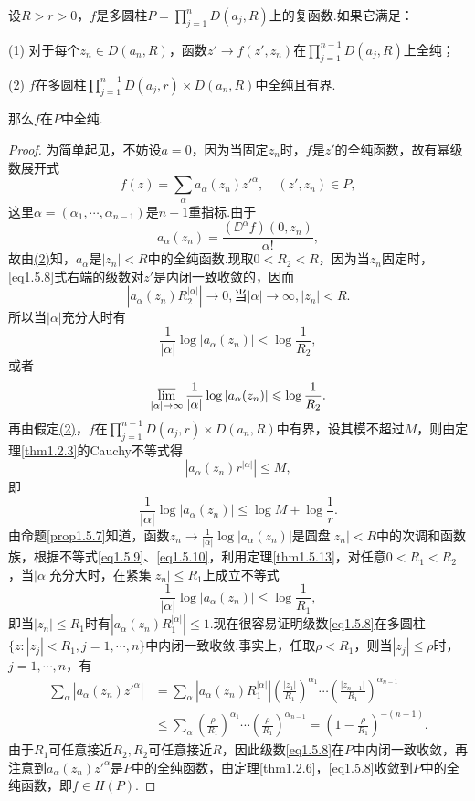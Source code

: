 \begin{lemma}\label{lem1.5.18}
	设$R>r>0$，$f$是多圆柱$P=\prod\limits_{j=1}^{n}D(a_j,R)$上的复函数.如果它满足：
	
	(1)\hypertarget{1.5.18}{}
	对于每个$z_n\in D(a_n,R)$，函数$z'\to f(z',z_n)$在$\prod\limits_{j=1}^{n-1} D(a_j,R)$上全纯；
	
	(2)\hypertarget{1.5.18}{}
	$f$在多圆柱$\prod\limits_{j=1}^{n-1}D(a_j,r)\times D(a_n,R)$中全纯且有界.
	
	那么$f$在$P$中全纯.
\end{lemma}
\begin{proof}
	为简单起见，不妨设$a=0$，因为当固定$z_n$时，$f$是$z'$的全纯函数，故有幂级数展开式
	\begin{equation}\label{eq1.5.8}
		f(z)=\sum_\alpha a_\alpha(z_n)z'^{\alpha},\quad (z',z_n)\in P,
	\end{equation}
这里$\alpha=(\alpha_1,\cdots,\alpha_{n-1})$是$n-1$重指标.由于
\[a_\alpha(z_n)=\frac{(\DD^\alpha f)(0,z_n)}{\alpha!},\]
故由\hyperlink{1.5.18}{(2)}知，$a_\alpha$是$|z_n|<R$中的全纯函数.现取$0<R_2<R$，因为当$z_n$固定时，\eqref{eq1.5.8}式右端的级数对$z'$是内闭一致收敛的，因而
\[\left|a_\alpha(z_n)R_2^{|\alpha|}\right|\to 0,\text{当}|\alpha|\to\infty,|z_n|<R.\]
所以当$|\alpha|$充分大时有
\[\frac1{|\alpha|}\log|a_\alpha(z_n)|<\log\frac1{R_2},\]
或者
\begin{equation}\label{eq1.5.9}
	\varlimsup_{|\alpha|\to\infty} \frac1{|\alpha|}\log|a_\alpha(z_n)|\le\log\frac1{R_2}.
\end{equation}
再由假定\hyperlink{1.5.18}{(2)}，$f$在$\prod\limits_{j=1}^{n-1}D(a_j,r)\times D(a_n,R)$中有界，设其模不超过$M$，则由定理\ref{thm1.2.3}的Cauchy不等式得
\[\left|a_\alpha(z_n)r^{|\alpha|}\right|\le M,\]
即
\begin{equation}\label{eq1.5.10}
	\frac1{|\alpha|}\log|a_\alpha(z_n)|\le\log M+\log\frac1r.
\end{equation}
由命题\ref{prop1.5.7}知道，函数$z_n\to\frac1{|\alpha|}\log|a_\alpha(z_n)|$是圆盘$|z_n|<R$中的次调和函数族，根据不等式\eqref{eq1.5.9}、\eqref{eq1.5.10}，利用定理\ref{thm1.5.13}，对任意$0<R_1<R_2$，当$|\alpha|$充分大时，在紧集$|z_n|\le R_1$上成立不等式
\[\frac1{|\alpha|}\log|a_\alpha(z_n)|\le\log\frac1{R_1},\]
即当$|z_n|\le R_1$时有$\left|a_\alpha(z_n)R_1^{|\alpha|}\right|\le1$.现在很容易证明级数\eqref{eq1.5.8}在多圆柱$\{z\colon|z_j|<R_1,j=1,\cdots,n\}$中内闭一致收敛.事实上，任取$\rho<R_1$，则当$|z_j|\le\rho$时，$j=1,\cdots,n$，有
\begin{align*}
	\sum_\alpha |a_\alpha(z_n)z'^{\alpha}|
	&=\sum_\alpha\left|a_\alpha(z_n)R_1^{|\alpha|}\right|\left(\frac{|z_1|}{R_1}\right)^{\alpha_1}\cdots\left(\frac{|z_{n-1}|}{R_1}\right)^{\alpha_{n-1}}\\
	&\le\sum_\alpha\left(\frac{\rho}{R_1}\right)^{\alpha_1}\cdots \left(\frac{\rho}{R_1}\right)^{\alpha_{n-1}}=\left(1-\frac{\rho}{R_1}\right)^{-(n-1)}.
\end{align*}
由于$R_1$可任意接近$R_2,R_2$可任意接近$R$，因此级数\eqref{eq1.5.8}在$P$中内闭一致收敛，再注意到$a_\alpha(z_n)z'^{\alpha}$是$P$中的全纯函数，由定理\ref{thm1.2.6}，\eqref{eq1.5.8}收敛到$P$中的全纯函数，即$f\in H(P)$.
\end{proof}

